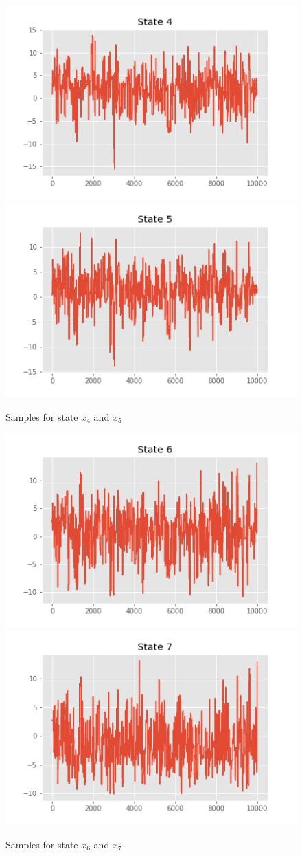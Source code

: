 \documentclass[]{article}
\begin{document}
	\begin{figure}[H]
		\begin{center}
			\includegraphics[width=.4\textwidth]{task2/figures/T_2_2/Q1/plt_x4.png}
			\includegraphics[width=.4\textwidth]{task2/figures/T_2_2/Q1/plt_x5.png}
			
			\caption*{Samples for state $x_4$ and $x_5$}
		\end{center}
	\end{figure}
	
	\begin{figure}[H]
		\begin{center}
			\includegraphics[width=.4\textwidth]{task2/figures/T_2_2/Q1/plt_x6.png}
			\includegraphics[width=.4\textwidth]{task2/figures/T_2_2/Q1/plt_x7.png}
			
			\caption*{Samples for state $x_6$ and $x_7$}
		\end{center}
	\end{figure}
	
\end{document}
